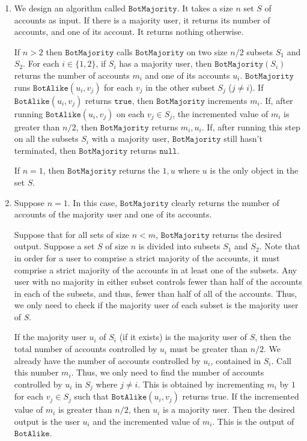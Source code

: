\documentclass[12 pt, letterpaper]{hmcpset}
\begin{document}
\begin{solution}
	\begin{enumerate}
		\item We design an algorithm called $\mathtt{BotMajority}$. It takes a size $n$ set $S$ of accounts as input. If there is a majority user, it returns its number of accounts, and one of its account. It returns nothing otherwise.

			If $n > 2$ then $\mathtt{BotMajority}$ calls $\mathtt{BotMajority}$ on two size $n / 2$ subsets $S_{1}$ and $S_{2}$. For each $i \in \{ 1, 2 \}$, if $S_{i}$ has a majority user, then $\mathtt{BotMajority}(S_{i})$ returns the number of accounts $m_{i}$ and one of its accounts $u_{i}$. $\mathtt{BotMajority}$ runs $\mathtt{BotAlike}(u_{i}, v_{j})$ for each $v_{j}$ in the other subset $S_{j}$ ($j \neq i$). If $\mathtt{BotAlike}(u_{i}, v_{j})$ returns $\mathtt{true}$, then $\mathtt{BotMajority}$ increments $m_{i}$. If, after running $\mathtt{BotAlike}(u_{i}, v_{j})$ on each $v_{j} \in S_{j}$, the incremented value of $m_{i}$ is greater than $n / 2$, then $\mathtt{BotMajority}$ returns $m_{i}, u_{i}$. If, after running this step on all the subsets $S_{i}$ with a majority user, $\mathtt{BotMajority}$ still hasn't terminated, then $\mathtt{BotMajority}$ returns $\mathtt{null}$.

			If $n = 1$, then $\mathtt{BotMajority}$ returns the $1, u$ where $u$ is the only object in the set $S$.

		\item Suppose $n = 1$. In this case, $\mathtt{BotMajority}$ clearly returns the number of accounts of the majority user and one of its accounts.

			Suppose that for all sets of size $n < m$, $\mathtt{BotMajority}$ returns the desired output. Suppose a set $S$ of size $n$ is divided into subsets $S_{1}$ and $S_{2}$. Note that in order for a user to comprise a strict majority of the accounts, it must comprise a strict majority of the accounts in at least one of the subsets. Any user with no majority in either subset controls fewer than half of the accounts in each of the subsets, and thus, fewer than half of all of the accounts. Thus, we only need to check if the majority user of each subset is the majority user of $S$.

			If the majority user $u_{i}$ of $S_{i}$ (if it exists) is the majority user of $S$, then the total number of accounts controlled by $u_{i}$ must be greater than $n / 2$. We already have the number of accounts controlled by $u_{i}$, contained in $S_{i}$. Call this number $m_{i}$. Thus, we only need to find the number of accounts controlled by $u_{i}$ in $S_{j}$ where $j \neq i$. This is obtained by incrementing $m_{i}$ by $1$ for each $v_{j} \in S_{j}$ such that $\mathtt{BotAlike}(u_{i}, v_{j})$ returns true. If the incremented value of $m_{i}$ is greater than $n / 2$, then $u_{i}$ is a majority user. Then the desired output is the user $u_{i}$ and the incremented value of $m_{i}$. This is the output of $\mathtt{BotAlike}$.


\end{enumerate}
\end{solution}
\end{document}
